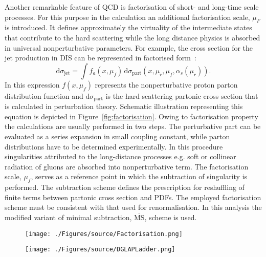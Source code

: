 Another remarkable feature of QCD is factorisation of short- and long-time scale processes. For this purpose in the calculation an additional factorisation scale, $\mu_F$ is introduced. It defines approximately the virtuality of the intermediate states that contribute to the hard scattering while the long distance physics is absorbed in universal nonperturbative parameters. For example, the cross section for the jet production in DIS can be represented in factorised form~\cite{Collins Factorization of Hard Processes in}:
\begin{equation}
 \mathrm{d}\sigma_{\mathrm{jet}} = \int{f_a\left(x,\mu_f\right)}\, \mathrm{d}\sigma_{\mathrm{part}}\left(x,\mu_r, \mu_f, \alpha_s\left(\mu_r\right) \right).
\label{eq:disfactorisation}
\end{equation} 
In this expression $f\left(x,\mu_f\right)$ represents the nonperturbative proton parton distribution function and $\mathrm{d}\sigma_{\mathrm{part}}$ is the hard scattering partonic cross section that is calculated in perturbation theory. Schematic illustration representing this equation is depicted in Figure~\ref{fig:factorisation}. Owing to factorisation property the calculations are usually performed in two steps. The perturbative part can be evaluated as a series expansion in small coupling constant, while parton distributions have to be determined experimentally. In this procedure singularities attributed to the long-distance processes e.g. soft or collinear radiation of gluons are absorbed into nonperturbative term. The factorisation scale, $\mu_f$, serves as a reference point in which the subtraction of singularity is performed. The subtraction scheme defines the prescription for reshuffling of finite terms between partonic cross section and PDFs. The employed factorisation scheme must be consistent with that used for renormalisation. In this analysis the modified variant of minimal subtraction, $\overline{\mathrm{MS}}$, scheme is used.
\begin{figure}[t]
	\centering
	\begin{subfloat}[]{
		\texttt{[image: ./Figures/source/Factorisation.png]}
		\label{fig:Factorisation}
	 }%
	\end{subfloat}
	\begin{subfloat}[]{
		\texttt{[image: ./Figures/source/DGLAPLadder.png]}
		\label{fig:DGLAPLadder}
	}%
	\end{subfloat}
	\caption{}
\label{fig:factorisationdglapladder}
\end{figure}
